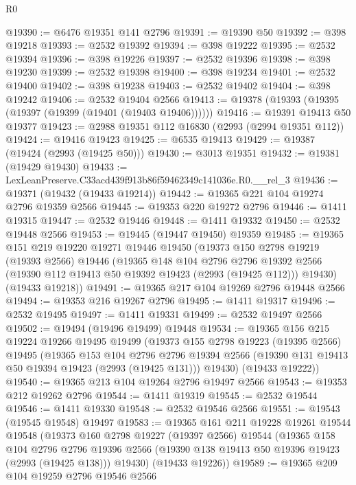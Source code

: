\begin{lexlean}{R0}
\begin{coremodule}
@19390 := @6476 @19351 @141 @2796
@19391 := @19390 @50
@19392 := @398 @19218
@19393 := @2532 @19392
@19394 := @398 @19222
@19395 := @2532 @19394
@19396 := @398 @19226
@19397 := @2532 @19396
@19398 := @398 @19230
@19399 := @2532 @19398
@19400 := @398 @19234
@19401 := @2532 @19400
@19402 := @398 @19238
@19403 := @2532 @19402
@19404 := @398 @19242
@19406 := @2532 @19404 @2566
@19413 := @19378 (@19393 (@19395 (@19397 (@19399 (@19401 (@19403 @19406))))))
@19416 := @19391 @19413 @50 @19377
@19423 := @2988 @19351 @112 @16830 (@2993 (@2994 @19351 @112))
@19424 := @19416 @19423
@19425 := @6535 @19413
@19429 := @19387 (@19424 (@2993 (@19425 @50)))
@19430 := @3013 @19351
@19432 := @19381 (@19429 @19430)
@19433 := LexLeanPreserve.C33acd439f913b86f59462349c141036e.R0.__rel_3
@19436 := @19371 (@19432 (@19433 @19214))
@19442 := @19365 @221 @104 @19274 @2796 @19359 @2566
@19445 := @19353 @220 @19272 @2796
@19446 := @1411 @19315
@19447 := @2532 @19446
@19448 := @1411 @19332
@19450 := @2532 @19448 @2566
@19453 := @19445 (@19447 @19450) @19359
@19485 := @19365
    @151
    @219
    @19220
    @19271
    @19446
    @19450
    (@19373
      @150
      @2798
      @19219
      (@19393 @2566)
      @19446
      (@19365
        @148
        @104
        @2796
        @2796
        @19392
        @2566
        (@19390 @112 @19413 @50 @19392 @19423 (@2993 (@19425 @112)))
        @19430)
      (@19433 @19218))
@19491 := @19365 @217 @104 @19269 @2796 @19448 @2566
@19494 := @19353 @216 @19267 @2796
@19495 := @1411 @19317
@19496 := @2532 @19495
@19497 := @1411 @19331
@19499 := @2532 @19497 @2566
@19502 := @19494 (@19496 @19499) @19448
@19534 := @19365
    @156
    @215
    @19224
    @19266
    @19495
    @19499
    (@19373
      @155
      @2798
      @19223
      (@19395 @2566)
      @19495
      (@19365
        @153
        @104
        @2796
        @2796
        @19394
        @2566
        (@19390 @131 @19413 @50 @19394 @19423 (@2993 (@19425 @131)))
        @19430)
      (@19433 @19222))
@19540 := @19365 @213 @104 @19264 @2796 @19497 @2566
@19543 := @19353 @212 @19262 @2796
@19544 := @1411 @19319
@19545 := @2532 @19544
@19546 := @1411 @19330
@19548 := @2532 @19546 @2566
@19551 := @19543 (@19545 @19548) @19497
@19583 := @19365
    @161
    @211
    @19228
    @19261
    @19544
    @19548
    (@19373
      @160
      @2798
      @19227
      (@19397 @2566)
      @19544
      (@19365
        @158
        @104
        @2796
        @2796
        @19396
        @2566
        (@19390 @138 @19413 @50 @19396 @19423 (@2993 (@19425 @138)))
        @19430)
      (@19433 @19226))
@19589 := @19365 @209 @104 @19259 @2796 @19546 @2566

\end{coremodule}
\end{lexlean}
